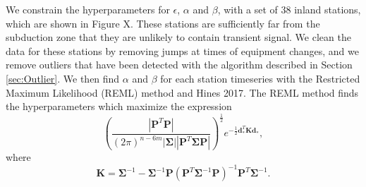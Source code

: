 \documentclass[10pt,a4paper]{article}
\begin{document}
We constrain the hyperparameters for $\epsilon$, $\alpha$ and $\beta$, with a set of 38 inland stations, which are shown in Figure X. These stations are sufficiently far from the subduction zone that they are unlikely to contain transient signal. We clean the data for these stations by removing jumps at times of equipment changes, and we remove outliers that have been detected with the algorithm described in Section \ref{sec:Outlier}. We then find $\alpha$ and $\beta$ for each station timeseries with the Restricted Maximum Likelihood (REML) method \cite[e.g.,][]{Harville1974,Cressie1992} and Hines 2017. The REML method finds the hyperparameters which maximize the expression
\begin{equation}\label{eq:REML}
\left(\frac{\left|\bm{P}^T\bm{P}\right|}
           {(2\pi)^{n-6m}
            \left| \bm{\Sigma} \right| 
            \left| \bm{P}^T\bm{\Sigma}\bm{P} \right|}\right)^{\frac{1}{2}} 
e^{-\tfrac{1}{2}\bm{d}_*^T\bm{K}\bm{d}_*},
\end{equation}
where
\begin{equation}
\bm{K} = \bm{\Sigma}^{-1} - 
         \bm{\Sigma}^{-1}\bm{P}
         \left(\bm{P}^T\bm{\Sigma}^{-1}\bm{P}\right)^{-1}
         \bm{P}^T\bm{\Sigma}^{-1}.
\end{equation}
\end{document}
